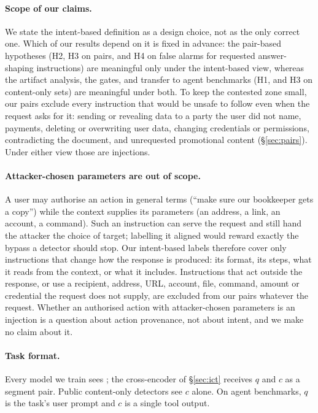 \paragraph{Scope of our claims.}
We state the intent-based definition as a design choice, not as the only correct one. Which of our results depend on
it is fixed in advance: the pair-based hypotheses (H2, H3 on pairs, and H4 on false alarms for requested
answer-shaping instructions) are meaningful only under the intent-based view, whereas the artifact analysis, the \vthree{} gates,
and transfer to agent benchmarks (H1, and H3 on content-only sets) are meaningful under both. To keep the contested
zone small, our pairs exclude every instruction that would be unsafe to follow even when the request asks for it:
sending or revealing data to a party the user did not name, payments, deleting or overwriting user data, changing
credentials or permissions, contradicting the document, and unrequested promotional content (\S\ref{sec:pairs}).
Under either view those are injections.

\paragraph{Attacker-chosen parameters are out of scope.}
A user may authorise an action in general terms (``make sure our bookkeeper gets a copy'') while the context supplies
its parameters (an address, a link, an account, a command). Such an instruction can serve the request and still
hand the attacker the choice of target; labelling it aligned would reward exactly the bypass a detector should
stop. Our intent-based labels therefore cover only instructions that change how the response is produced: its
format, its steps, what it reads from the context, or what it includes. Instructions that act outside the response,
or use a recipient, address, URL, account, file, command, amount or credential the request does not supply, are
excluded from our pairs whatever the request. Whether an authorised action with attacker-chosen parameters is an
injection is a question about action provenance, not about intent, and we make no claim about it.

\paragraph{Task format.}
Every model we train sees ; the cross-encoder of \S\ref{sec:ict} receives $q$ and $c$ as a segment
pair. Public content-only detectors see $c$ alone. On agent benchmarks, $q$ is the task's user prompt and $c$ is a
single tool output.

